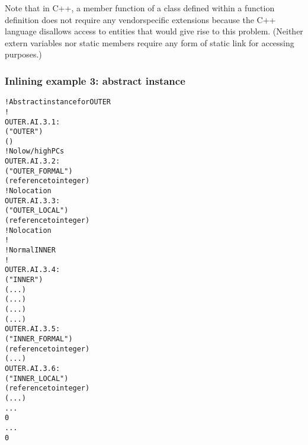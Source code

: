 Note that in C++, a member function of a class defined within
a function definition does not require any vendor\dash specific
extensions because the C++ language disallows access to
entities that would give rise to this problem. (Neither extern
variables nor static members require any form of static link
for accessing purposes.)

\subsubsection{Inlining example 3: abstract instance}
\label{app:inliningexample3abstractinstance}
\begin{alltt}
    ! Abstract instance for OUTER
    ! 
OUTER.AI.3.1:
        ("OUTER")
        ()
        ! No low/high PCs
OUTER.AI.3.2:
            ("OUTER\_FORMAL")
            (reference to integer)
            ! No location
OUTER.AI.3.3:
            ("OUTER\_LOCAL")
            (reference to integer)
            ! No location
        !
        ! Normal INNER
        !
OUTER.AI.3.4:
            ("INNER")
            (...)
            (...)
            (...)
            (...)
OUTER.AI.3.5:
                ("INNER\_FORMAL")
                (reference to integer)
                (...)
OUTER.AI.3.6:
                ("INNER\_LOCAL")
                (reference to integer)
                (...)
            ...
            0
        ...
        0
\end{alltt}


